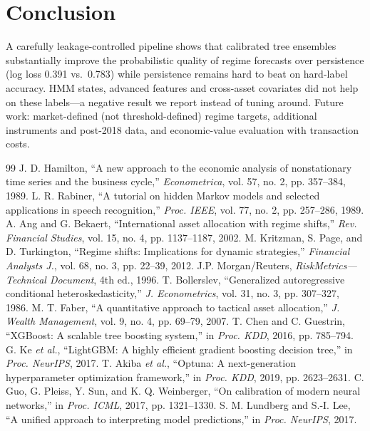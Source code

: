 \documentclass[conference]{IEEEtran}
\begin{document}
\section{Conclusion}
A carefully leakage-controlled pipeline shows that calibrated tree ensembles substantially improve the probabilistic quality of regime forecasts over persistence (log loss 0.391 vs.\ 0.783) while persistence remains hard to beat on hard-label accuracy. HMM states, advanced features and cross-asset covariates did not help on these labels---a negative result we report instead of tuning around. Future work: market-defined (not threshold-defined) regime targets, additional instruments and post-2018 data, and economic-value evaluation with transaction costs.

\begin{thebibliography}{99}\small
{} J. D. Hamilton, ``A new approach to the economic analysis of nonstationary time series and the business cycle,'' \emph{Econometrica}, vol. 57, no. 2, pp. 357--384, 1989.
 L. R. Rabiner, ``A tutorial on hidden Markov models and selected applications in speech recognition,'' \emph{Proc. IEEE}, vol. 77, no. 2, pp. 257--286, 1989.
 A. Ang and G. Bekaert, ``International asset allocation with regime shifts,'' \emph{Rev. Financial Studies}, vol. 15, no. 4, pp. 1137--1187, 2002.
 M. Kritzman, S. Page, and D. Turkington, ``Regime shifts: Implications for dynamic strategies,'' \emph{Financial Analysts J.}, vol. 68, no. 3, pp. 22--39, 2012.
 J.P. Morgan/Reuters, \emph{RiskMetrics---Technical Document}, 4th ed., 1996.
 T. Bollerslev, ``Generalized autoregressive conditional heteroskedasticity,'' \emph{J. Econometrics}, vol. 31, no. 3, pp. 307--327, 1986.
 M. T. Faber, ``A quantitative approach to tactical asset allocation,'' \emph{J. Wealth Management}, vol. 9, no. 4, pp. 69--79, 2007.
 T. Chen and C. Guestrin, ``XGBoost: A scalable tree boosting system,'' in \emph{Proc. KDD}, 2016, pp. 785--794.
 G. Ke \emph{et al.}, ``LightGBM: A highly efficient gradient boosting decision tree,'' in \emph{Proc. NeurIPS}, 2017.
 T. Akiba \emph{et al.}, ``Optuna: A next-generation hyperparameter optimization framework,'' in \emph{Proc. KDD}, 2019, pp. 2623--2631.
 C. Guo, G. Pleiss, Y. Sun, and K. Q. Weinberger, ``On calibration of modern neural networks,'' in \emph{Proc. ICML}, 2017, pp. 1321--1330.
 S. M. Lundberg and S.-I. Lee, ``A unified approach to interpreting model predictions,'' in \emph{Proc. NeurIPS}, 2017.
\end{thebibliography}
\end{document}
